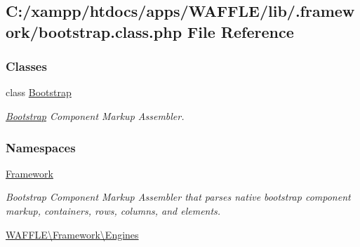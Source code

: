 \hypertarget{bootstrap_8class_8php}{}\subsection{C\+:/xampp/htdocs/apps/\+W\+A\+F\+F\+L\+E/lib/.framework/bootstrap.class.\+php File Reference}
\label{bootstrap_8class_8php}
\subsubsection*{Classes}
\begin{DoxyCompactItemize}
\item 
class \hyperlink{class_w_a_f_f_l_e_1_1_framework_1_1_engines_1_1_bootstrap}{Bootstrap}
\begin{DoxyCompactList}\small\item\em \hyperlink{class_w_a_f_f_l_e_1_1_framework_1_1_engines_1_1_bootstrap}{Bootstrap} Component Markup Assembler. \end{DoxyCompactList}\end{DoxyCompactItemize}
\subsubsection*{Namespaces}
\begin{DoxyCompactItemize}
\item 
 \hyperlink{namespace_framework}{Framework}
\begin{DoxyCompactList}\small\item\em Bootstrap Component Markup Assembler that parses native bootstrap component markup, containers, rows, columns, and elements. \end{DoxyCompactList}\item 
 \hyperlink{namespace_w_a_f_f_l_e_1_1_framework_1_1_engines}{W\+A\+F\+F\+L\+E\textbackslash{}\+Framework\textbackslash{}\+Engines}
\end{DoxyCompactItemize}
